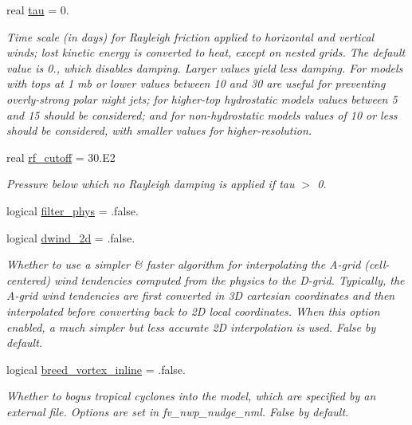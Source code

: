 \begin{DoxyCompactItemize}
real \hyperlink{structfv__arrays__mod_1_1fv__flags__type_ad0e102652d29d55c763458b70ea6e87d}{tau} = 0.
\begin{DoxyCompactList}\small\item\em Time scale (in days) for Rayleigh friction applied to horizontal and vertical winds; lost kinetic energy is converted to heat, except on nested grids. The default value is 0., which disables damping. Larger values yield less damping. For models with tops at 1 mb or lower values between 10 and 30 are useful for preventing overly-\/strong polar night jets; for higher-\/top hydrostatic models values between 5 and 15 should be considered; and for non-\/hydrostatic models values of 10 or less should be considered, with smaller values for higher-\/resolution. \end{DoxyCompactList}\item 
real \hyperlink{structfv__arrays__mod_1_1fv__flags__type_af2f39702a51d8d256599d8e2aeb6cea8}{rf\-\_\-cutoff} = 30.E2
\begin{DoxyCompactList}\small\item\em Pressure below which no Rayleigh damping is applied if tau $>$ 0. \end{DoxyCompactList}\item 
logical \hyperlink{structfv__arrays__mod_1_1fv__flags__type_aa08a96d7def8d7f16a3f9b76948c6006}{filter\-\_\-phys} = .false.
\item 
logical \hyperlink{structfv__arrays__mod_1_1fv__flags__type_a9474d862f9632b749ecc646cc0480e85}{dwind\-\_\-2d} = .false.
\begin{DoxyCompactList}\small\item\em Whether to use a simpler \& faster algorithm for interpolating the A-\/grid (cell-\/centered) wind tendencies computed from the physics to the D-\/grid. Typically, the A-\/grid wind tendencies are first converted in 3\-D cartesian coordinates and then interpolated before converting back to 2\-D local coordinates. When this option enabled, a much simpler but less accurate 2\-D interpolation is used. False by default. \end{DoxyCompactList}\item 
logical \hyperlink{structfv__arrays__mod_1_1fv__flags__type_ad128b78fa6f0bb043f04a6b4207d14f2}{breed\-\_\-vortex\-\_\-inline} = .false.
\begin{DoxyCompactList}\small\item\em Whether to bogus tropical cyclones into the model, which are specified by an external file. Options are set in fv\-\_\-nwp\-\_\-nudge\-\_\-nml. False by default. \end{DoxyCompactList}\item 

\end{DoxyCompactItemize}
